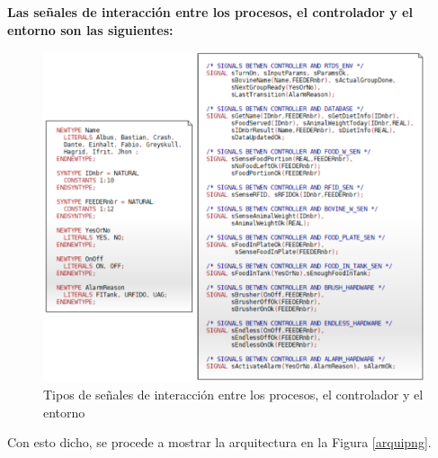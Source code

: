 \textbf{Las señales de interacción entre los procesos, el controlador y el entorno son las siguientes:}

\begin{figure}[H]
    \begin{center}
    	\includegraphics[scale=0.8]{img/senales2.png}
    \end{center}
    \caption{Tipos de señales de interacción entre los procesos, el controlador y el entorno}
    \label{senalespng}
\end{figure}

Con esto dicho, se procede a mostrar la arquitectura en la Figura \ref{arquipng}.


